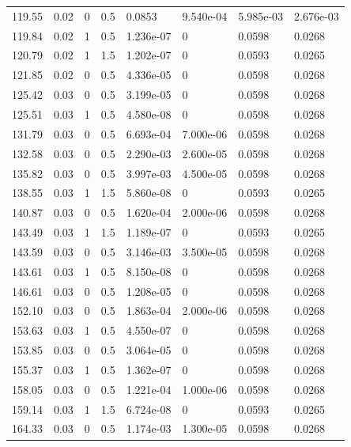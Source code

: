 \documentclass[preview]{standalone}
\begin{document}
{{{\begin{tabular}{L{1.2cm}C{1.2cm} C{0.3cm}C{0.5cm} C{1.4cm}C{1.4cm} C{1.4cm}C{1.4cm}}
  119.55  &  0.02  & 0     & 0.5 &  0.0853  & 9.540e-04  & 5.985e-03 &  2.676e-03   \\ 
  119.84  &  0.02  & 1     & 0.5 &  1.236e-07  & 0  & 0.0598 &  0.0268   \\ 
  120.79  &  0.02  & 1     & 1.5 &  1.202e-07  & 0  & 0.0593 &  0.0265   \\ 
  121.85  &  0.02  & 0     & 0.5 &  4.336e-05  & 0  & 0.0598 &  0.0268   \\ 
  125.42  &  0.03  & 0     & 0.5 &  3.199e-05  & 0  & 0.0598 &  0.0268   \\ 
  125.51  &  0.03  & 1     & 0.5 &  4.580e-08  & 0  & 0.0598 &  0.0268   \\ 
  131.79  &  0.03  & 0     & 0.5 &  6.693e-04  & 7.000e-06  & 0.0598 &  0.0268   \\ 
  132.58  &  0.03  & 0     & 0.5 &  2.290e-03  & 2.600e-05  & 0.0598 &  0.0268   \\ 
  135.82  &  0.03  & 0     & 0.5 &  3.997e-03  & 4.500e-05  & 0.0598 &  0.0268   \\ 
  138.55  &  0.03  & 1     & 1.5 &  5.860e-08  & 0  & 0.0593 &  0.0265   \\ 
  140.87  &  0.03  & 0     & 0.5 &  1.620e-04  & 2.000e-06  & 0.0598 &  0.0268   \\ 
  143.49  &  0.03  & 1     & 1.5 &  1.189e-07  & 0  & 0.0593 &  0.0265   \\ 
  143.59  &  0.03  & 0     & 0.5 &  3.146e-03  & 3.500e-05  & 0.0598 &  0.0268   \\ 
  143.61  &  0.03  & 1     & 0.5 &  8.150e-08  & 0  & 0.0598 &  0.0268   \\ 
  146.61  &  0.03  & 0     & 0.5 &  1.208e-05  & 0  & 0.0598 &  0.0268   \\ 
  152.10  &  0.03  & 0     & 0.5 &  1.863e-04  & 2.000e-06  & 0.0598 &  0.0268   \\ 
  153.63  &  0.03  & 1     & 0.5 &  4.550e-07  & 0  & 0.0598 &  0.0268   \\ 
  153.85  &  0.03  & 0     & 0.5 &  3.064e-05  & 0  & 0.0598 &  0.0268   \\ 
  155.37  &  0.03  & 1     & 0.5 &  1.362e-07  & 0  & 0.0598 &  0.0268   \\ 
  158.05  &  0.03  & 0     & 0.5 &  1.221e-04  & 1.000e-06  & 0.0598 &  0.0268   \\ 
  159.14  &  0.03  & 1     & 1.5 &  6.724e-08  & 0  & 0.0593 &  0.0265   \\ 
  164.33  &  0.03  & 0     & 0.5 &  1.174e-03  & 1.300e-05  & 0.0598 &  0.0268   \\ 

\end{tabular}}}}
\end{document}
